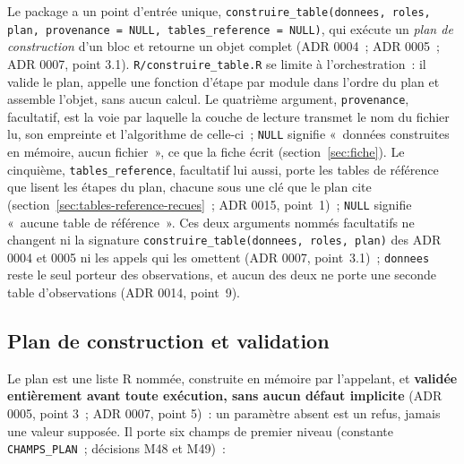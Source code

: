 \documentclass[a4paper,11pt]{article}
\newcommand{\code}[1]{\texttt{\small #1}}
\begin{document}
Le package a un point d'entrée unique,
\code{construire\_table(donnees, roles, plan, provenance = NULL, tables\_reference = NULL)}, qui exécute
un \emph{plan de construction} d'un bloc et retourne un objet complet
(ADR 0004~; ADR 0005~; ADR 0007, point 3.1). \code{R/construire\_table.R} se
limite à l'orchestration~: il valide le plan, appelle une fonction d'étape par
module dans l'ordre du plan et assemble l'objet, sans aucun calcul. Le
quatrième argument, \code{provenance}, facultatif, est la voie par laquelle la
couche de lecture transmet le nom du fichier lu, son empreinte et l'algorithme
de celle-ci~; \code{NULL} signifie «~données construites en mémoire, aucun
fichier~», ce que la fiche écrit (section~\ref{sec:fiche}). Le cinquième,
\code{tables\_reference}, facultatif lui aussi, porte les tables de
référence que lisent les étapes du plan, chacune sous une clé que le plan
cite (section~\ref{sec:tables-reference-recues}~; ADR 0015, point~1)~;
\code{NULL} signifie «~aucune table de référence~». Ces deux arguments
nommés facultatifs ne changent ni la signature
\code{construire\_table(donnees, roles, plan)} des ADR 0004 et 0005 ni les
appels qui les omettent (ADR 0007, point~3.1)~; \code{donnees} reste le
seul porteur des observations, et aucun des deux ne porte une seconde table
d'observations (ADR 0014, point~9).

\subsection{Plan de construction et validation}
\label{sec:plan}

Le plan est une liste R nommée, construite en mémoire par l'appelant, et
\textbf{validée entièrement avant toute exécution, sans aucun défaut
implicite} (ADR 0005, point 3~; ADR 0007, point 5)~: un paramètre absent est
un refus, jamais une valeur supposée. Il porte six champs de premier niveau
(constante \code{CHAMPS\_PLAN}~; décisions M48 et M49)~:
\end{document}
